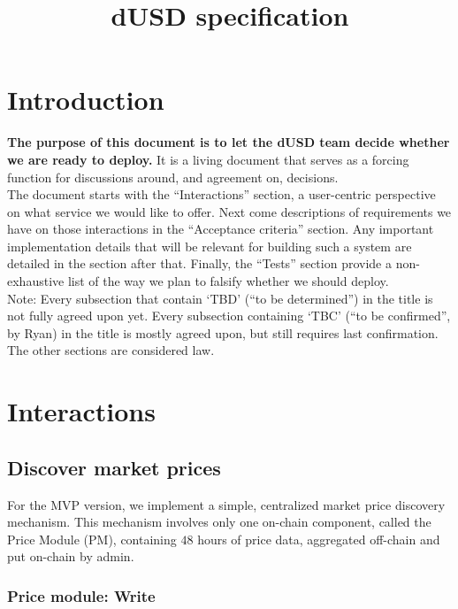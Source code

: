 \documentclass{article} %
\title{dUSD specification}
\begin{document}
\maketitle

\tableofcontents
\newpage

\section{Introduction}

\textbf{The purpose of this document is to let the dUSD team decide whether we are ready to deploy.}
It is a living document that serves as a forcing function for discussions
around, and agreement on, decisions. \\

The document starts with the ``Interactions'' section, a user-centric
perspective on what service we would like to offer.
Next come descriptions of requirements we have on those interactions in the
``Acceptance criteria'' section.
Any important implementation details that will be relevant for building such a
system are detailed in the section after that.
Finally, the ``Tests'' section provide a non-exhaustive list of the way we plan
to falsify whether we should deploy. \\

Note: Every subsection that contain `TBD' (``to be determined'') in the title is
not fully agreed upon yet.
Every subsection containing `TBC' (``to be confirmed'', by Ryan) in the title is
mostly agreed upon, but still requires last confirmation.
The other sections are considered law.

\section{Interactions}

\subsection{Discover market prices}

For the MVP version, we implement a simple, centralized market price discovery
mechanism. This mechanism involves only one on-chain component, called the Price
Module (PM), containing $48$ hours of price data, aggregated off-chain and put
on-chain by admin.

\subsubsection*{Price module: Write}
\end{document}
